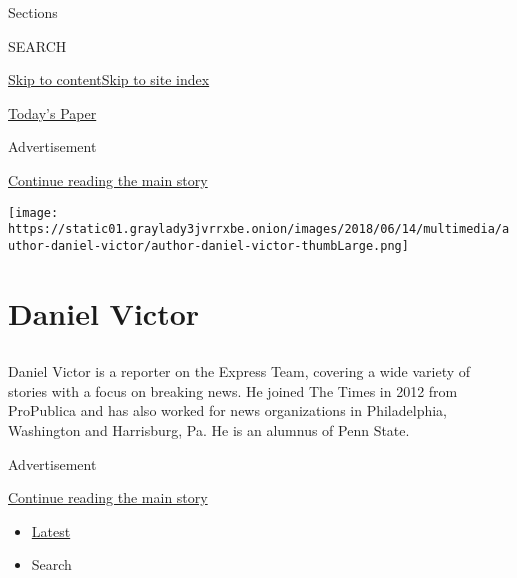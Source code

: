 Sections

SEARCH

\protect\hyperlink{site-content}{Skip to
content}\protect\hyperlink{site-index}{Skip to site index}

\href{https://myaccount.nytimes3xbfgragh.onion/auth/login?response_type=cookie\&client_id=vi}{}

\href{https://www.nytimes3xbfgragh.onion/section/todayspaper}{Today's
Paper}

Advertisement

\protect\hyperlink{after-top}{Continue reading the main story}

\texttt{[image: https://static01.graylady3jvrrxbe.onion/images/2018/06/14/multimedia/author-daniel-victor/author-daniel-victor-thumbLarge.png]}

\hypertarget{daniel-victor}{%
\section{Daniel Victor}\label{daniel-victor}}

\subsection{}

Daniel Victor is a reporter on the Express Team, covering a wide variety
of stories with a focus on breaking news. He joined The Times in 2012
from ProPublica and has also worked for news organizations in
Philadelphia, Washington and Harrisburg, Pa. He is an alumnus of Penn
State.

Advertisement

\protect\hyperlink{after-mid1}{Continue reading the main story}

\begin{itemize}
\tightlist
\item
  \protect\hyperlink{stream-panel}{Latest}
\item
  Search
\end{itemize}


